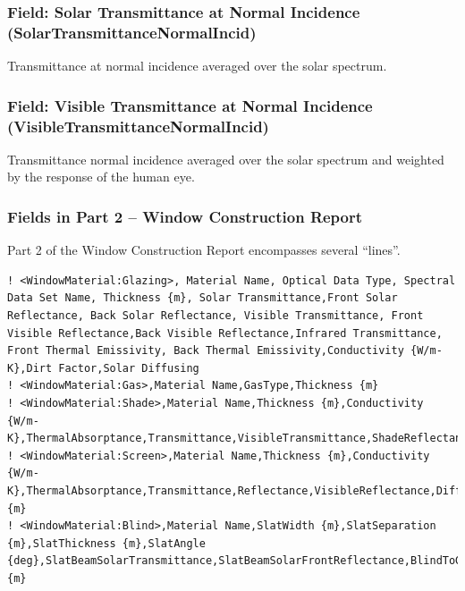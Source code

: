 \subsubsection{Field: Solar Transmittance at Normal Incidence (SolarTransmittanceNormalIncid)}\label{field-solar-transmittance-at-normal-incidence-solartransmittancenormalincid}

Transmittance at normal incidence averaged over the solar spectrum.

\subsubsection{Field: Visible Transmittance at Normal Incidence (VisibleTransmittanceNormalIncid)}\label{field-visible-transmittance-at-normal-incidence-visibletransmittancenormalincid}

Transmittance normal incidence averaged over the solar spectrum and weighted by the response of the human eye.

\subsubsection{Fields in Part 2 -- Window Construction Report}\label{fields-in-part-2-window-construction-report}

Part 2 of the Window Construction Report encompasses several ``lines''.

\begin{lstlisting}
! <WindowMaterial:Glazing>, Material Name, Optical Data Type, Spectral Data Set Name, Thickness {m}, Solar Transmittance,Front Solar Reflectance, Back Solar Reflectance, Visible Transmittance, Front Visible Reflectance,Back Visible Reflectance,Infrared Transmittance, Front Thermal Emissivity, Back Thermal Emissivity,Conductivity {W/m-K},Dirt Factor,Solar Diffusing
! <WindowMaterial:Gas>,Material Name,GasType,Thickness {m}
! <WindowMaterial:Shade>,Material Name,Thickness {m},Conductivity {W/m-K},ThermalAbsorptance,Transmittance,VisibleTransmittance,ShadeReflectance
! <WindowMaterial:Screen>,Material Name,Thickness {m},Conductivity {W/m-K},ThermalAbsorptance,Transmittance,Reflectance,VisibleReflectance,DiffuseReflectance,DiffuseVisibleReflectance,ScreenMaterialDiameterToSpacingRatio,ScreenToGlassDistance {m}
! <WindowMaterial:Blind>,Material Name,SlatWidth {m},SlatSeparation {m},SlatThickness {m},SlatAngle {deg},SlatBeamSolarTransmittance,SlatBeamSolarFrontReflectance,BlindToGlassDistance {m}
\end{lstlisting}


